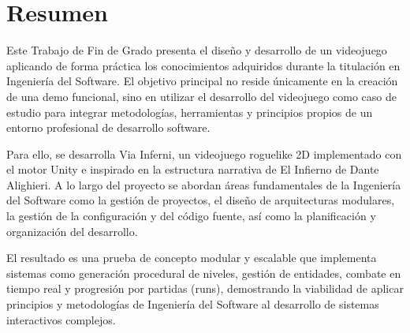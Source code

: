 \chapter*{Resumen}

Este Trabajo de Fin de Grado presenta el diseño y desarrollo de un videojuego 
aplicando de forma práctica los conocimientos adquiridos durante la titulación 
en Ingeniería del Software. El objetivo principal no reside únicamente en la 
creación de una demo funcional, sino en utilizar el desarrollo del videojuego 
como caso de estudio para integrar metodologías, herramientas y principios 
propios de un entorno profesional de desarrollo software.

Para ello, se desarrolla Via Inferni, un videojuego roguelike 2D implementado 
con el motor Unity e inspirado en la estructura narrativa de El Infierno de 
Dante Alighieri. A lo largo del proyecto se abordan áreas fundamentales de la 
Ingeniería del Software como la gestión de proyectos, el diseño de arquitecturas 
modulares, la gestión de la configuración y del código fuente, así como la 
planificación y organización del desarrollo.

El resultado es una prueba de concepto modular y escalable que implementa 
sistemas como generación procedural de niveles, gestión de entidades, combate 
en tiempo real y progresión por partidas (runs), demostrando la viabilidad de 
aplicar principios y metodologías de Ingeniería del Software al desarrollo de 
sistemas interactivos complejos.